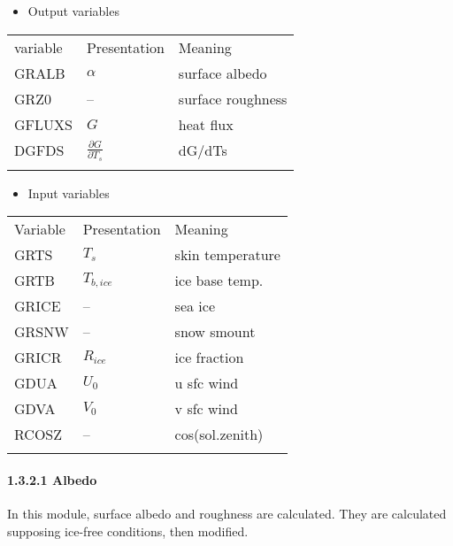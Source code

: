 \begin{itemize}
\tightlist
\item
  Output variables
\end{itemize}

\setlength\LTleft{0pt}\setlength\LTright{0pt}\begin{longtable}[]{@{}lll@{}}
\toprule\relax
variable & Presentation & Meaning \\ \addlinespace
\midrule\relax
\endhead
GRALB & \(\alpha\) & surface albedo \\ \addlinespace
GRZ0 & -- & surface roughness \\ \addlinespace
GFLUXS & \(G\) & heat flux \\ \addlinespace
DGFDS & \(\frac{\partial G}{\partial T_s}\) & dG/dTs \\ \addlinespace
\bottomrule
\end{longtable}

\begin{itemize}
\tightlist
\item
  Input variables
\end{itemize}

\setlength\LTleft{0pt}\setlength\LTright{0pt}\begin{longtable}[]{@{}lll@{}}
\toprule\relax
Variable & Presentation & Meaning \\ \addlinespace
\midrule\relax
\endhead
GRTS & \(T_s\) & skin temperature \\ \addlinespace
GRTB & \(T_{b,ice}\) & ice base temp. \\ \addlinespace
GRICE & -- & sea ice \\ \addlinespace
GRSNW & -- & snow smount \\ \addlinespace
GRICR & \(R_{ice}\) & ice fraction \\ \addlinespace
GDUA & \(U_0\) & u sfc wind \\ \addlinespace
GDVA & \(V_0\) & v sfc wind \\ \addlinespace
RCOSZ & -- & cos(sol.zenith) \\ \addlinespace
\bottomrule
\end{longtable}

\hypertarget{albedo}{%
\paragraph{1.3.2.1 Albedo}\label{albedo}}

In this module, surface albedo and roughness are calculated. They are
calculated supposing ice-free conditions, then modified.


